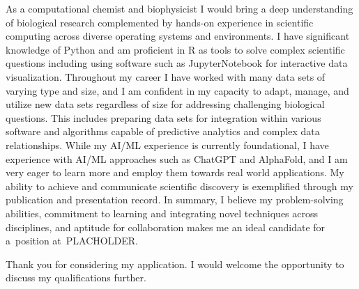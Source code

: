 \documentclass[11pt, a4paper]{awesome-cv}
\newcommand{\companyname}{PLACHOLDER}
\newcommand{\role}{PLACEHOLDER}
\newcommand{\brole}{\textbf{\role}}
\begin{document}
\begin{cvletter}
		
		As a computational chemist and biophysicist I would bring a deep understanding of biological research complemented by hands-on experience in scientific computing across diverse operating systems and environments. %
		I have significant knowledge of Python and am proficient in R as tools to solve complex scientific questions including using software such as JupyterNotebook for interactive data visualization.
		Throughout my career I have worked with many data sets of varying type and size, and I am confident in my capacity to adapt, manage, and utilize new data sets regardless of size for addressing challenging biological questions. This includes preparing data sets for integration within various software and algorithms capable of predictive analytics and complex data relationships.
		While my AI/ML experience is currently foundational, I have experience with AI/ML approaches such as ChatGPT and AlphaFold, and I am  very eager to learn more and employ them towards real world applications.
		My ability to achieve and communicate scientific discovery is exemplified through my publication and presentation record.
		In summary, I believe my problem-solving abilities, commitment to learning and integrating novel techniques across disciplines, and aptitude for collaboration makes me an ideal candidate for a~position at~\companyname.
		
	\end{cvletter}

	Thank you for considering my application. I would welcome the opportunity to discuss my qualifications further.
	
	\makeletterclosing
\end{document}
